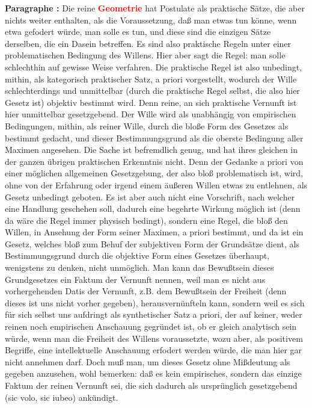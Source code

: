 \documentclass[a4paper,12pt,twoside]{book}
\newcommand{\match}[1]{\textcolor{red}{\textbf{#1}}}
\begin{document}
	\textbf{Paragraphe : }Die reine \match{Geometrie} hat Postulate als praktische Sätze, die aber nichts weiter enthalten, als die Voraussetzung, daß man etwas tun könne, wenn etwa gefodert würde, man solle es tun, und diese sind die einzigen Sätze derselben, die ein Dasein betreffen. Es sind also praktische Regeln unter einer problematischen Bedingung des Willens. Hier aber sagt die Regel: man solle schlechthin auf gewisse Weise verfahren. Die praktische Regel ist also unbedingt, mithin, als kategorisch praktischer Satz, a priori vorgestellt, wodurch der Wille schlechterdings und unmittelbar (durch die praktische Regel selbst, die also hier Gesetz ist) objektiv bestimmt wird. Denn reine, an sich praktische Vernunft ist hier unmittelbar gesetzgebend. Der Wille wird als unabhängig von empirischen Bedingungen, mithin, als reiner Wille, durch die bloße Form des Gesetzes als bestimmt gedacht, und dieser Bestimmungsgrund als die oberste Bedingung aller Maximen angesehen. Die Sache ist befremdlich genug, und hat ihres gleichen in der ganzen übrigen praktischen Erkenntnis nicht. Denn der Gedanke a priori von einer möglichen allgemeinen Gesetzgebung, der also bloß problematisch ist, wird, ohne von der Erfahrung oder irgend einem äußeren Willen etwas zu entlehnen, als Gesetz unbedingt geboten. Es ist aber auch nicht eine Vorschrift, nach welcher eine Handlung geschehen soll, dadurch eine begehrte Wirkung möglich ist (denn da wäre die Regel immer physisch bedingt), sondern eine Regel, die bloß den Willen, in Ansehung der Form seiner Maximen, a priori bestimmt, und da ist ein Gesetz, welches bloß zum Behuf der subjektiven Form der Grundsätze dient, als Bestimmungsgrund durch die objektive Form eines Gesetzes überhaupt, wenigstens zu denken, nicht unmöglich. Man kann das Bewußtsein dieses Grundgesetzes ein Faktum der Vernunft nennen, weil man es nicht aus vorhergehenden Datis der Vernunft, z.B. dem Bewußtsein der Freiheit (denn dieses ist uns nicht vorher gegeben), herausvernünfteln kann, sondern weil es sich für sich selbst uns aufdringt als  synthetischer Satz a priori, der auf keiner, weder reinen noch empirischen Anschauung gegründet ist, ob er gleich analytisch sein würde, wenn man die Freiheit des Willens voraussetzte, wozu aber, als positivem Begriffe, eine intellektuelle Anschauung erfodert werden würde, die man hier gar nicht annehmen darf. Doch muß man, um dieses Gesetz ohne Mißdeutung als gegeben anzusehen, wohl bemerken: daß es kein empirisches, sondern das einzige Faktum der reinen Vernunft sei, die sich dadurch als ursprünglich gesetzgebend (sic volo, sic iubeo) ankündigt. 
	
\end{document}
